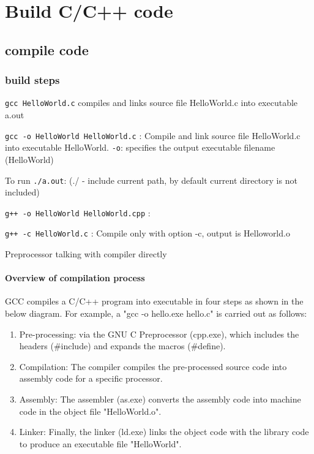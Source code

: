 \chapter{Build C/C++ code}

\section{compile code} 

\subsection{build steps} 

\texttt{gcc HelloWorld.c}  compiles and links source file HelloWorld.c into executable a.out


\texttt{gcc -o HelloWorld HelloWorld.c} : Compile and link source file HelloWorld.c into executable HelloWorld. \texttt{-o}: specifies the output executable filename (HelloWorld)


To run \texttt{./a.out}: (./ - include current path, by default current directory is not included)


\texttt{g++ -o HelloWorld HelloWorld.cpp} : 


\texttt{g++ -c HelloWorld.c} : Compile only with option -c, output is Helloworld.o


Preprocessor talking with compiler directly 


\subsubsection{Overview of compilation process}%
\label{ssub:overview_of_compilation_process}
GCC compiles a C/C++ program into executable in four steps as shown in the below diagram.  For example, a "gcc -o hello.exe hello.c" is carried out as follows:

\begin{enumerate}
  \item Pre-processing: via the GNU C Preprocessor (cpp.exe), which includes the headers (\#include) and expands the macros (\#define). 
  \item Compilation: The compiler compiles the pre-processed source code into assembly code for a specific processor. 
  \item Assembly: The assembler (as.exe) converts the assembly code into machine code in the object file "HelloWorld.o". 
  \item Linker: Finally, the linker (ld.exe) links the object code with the library code to produce an executable file "HelloWorld". 
\end{enumerate}

